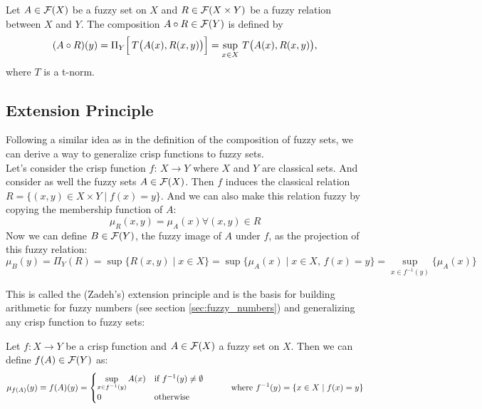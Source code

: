 \begin{definition}
    Let \( A \in \mathcal{F}(X) \) be a fuzzy set on \(X\) and \( R \in \mathcal{F}(X \times Y) \) be a fuzzy relation between \(X\) and \(Y\). The composition \( A \circ R \in \mathcal{F}(Y) \) is defined by
    \[
    (A \circ R)(y) = \Pi_{Y}\Bigl[\, T\bigl( A(x), R(x,y) \bigr) \Bigr] = \sup_{x \in X}\, T\bigl( A(x), R(x,y) \bigr),
    \]
    where \(T\) is a t-norm.
\end{definition}



\subsection{Extension Principle}

Following a similar idea as in the definition of the composition of fuzzy sets, we can derive a way to generalize crisp functions  to fuzzy sets.\\

Let's consider the crisp function $f:\,X \longrightarrow Y$ where $X$ and $Y$ are classical sets. And consider as well the fuzzy sets $A \in \mathcal{F}(X)$. Then $f$ induces the classical relation $R=\{(x,y)\in X\times Y \mid f(x)=y\}$. And we can also make this relation fuzzy by copying the membership function of $A$:
$$ \mu_R (x,y) = \mu_A (x) \forall (x,y)\in R$$
Now we can define $B\in\mathcal{F}(Y)$, the fuzzy image of $A$ under $f$, as the projection of this fuzzy relation:
$$\mu_B (y) = \Pi_Y (R) = \sup\{R(x,y)\mid x\in X\} = \sup\{\mu_A (x)\mid x\in X, \, f(x)= y\} = \sup_{x\in f^{-1}(y)}\{\mu_A(x)\}$$

This is called the (Zadeh's) extension principle and is the basis for building arithmetic for fuzzy numbers (see section \ref{sec:fuzzy_numbers}) and generalizing any crisp function to fuzzy sets: 

\begin{definition}
  Let $f: X \longrightarrow Y$ be a crisp function and $A\in \mathcal{F}(X)$ a fuzzy set on $X$. Then we can define $f(A)\in \mathcal{F}(Y)$ as:
  \[
  \mu_{f(A)}(y)\equiv f(A)(y) = 
  \begin{cases}
    \sup_{x\in f^{-1}(y)}A(x) & \textnormal{if } f^{-1}(y)\neq \emptyset\\
    0 & \textnormal{otherwise}
  \end{cases}
  \quad\quad\quad \textnormal{where } f^{-1}(y)=\{x\in X \mid f(x)=y\}
  \]
\end{definition}


